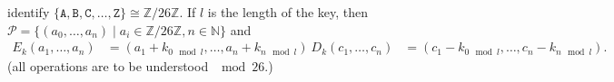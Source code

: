 identify $\lbrace \mathtt{A, B, C, …, Z} \rbrace \cong ℤ / 26 ℤ$. If $l$ is the length of the key, then $\mathcal{P} = \lbrace{(a_0, …,a_n) \mid a_i ∈ ℤ / 26 ℤ, n ∈ ℕ}\rbrace$ and $$\begin{aligned} E_k(a_1, …, a_n) &= (a_1 + k_{0 \mod l}, …, a_n + k_{n \mod l})\ D_k(c_1, …, c_n) &= (c_1 - k_{0 \mod l}, …, c_n - k_{n \mod l}). \end{aligned} $$ (all operations are to be understood $\mod 26$.)
